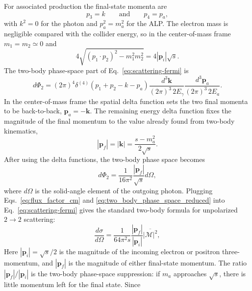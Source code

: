 \documentclass[12pt,a4paper]{article}
\begin{document}
For associated production the final-state momenta are
\begin{equation}
    p_3=k
    \qquad\text{and}\qquad
    p_4=p_a,
\end{equation}
with $k^2=0$ for the photon and $p_a^2=m_{a}^2$ for the ALP. The electron mass
is negligible compared with the collider energy, so in the center-of-mass
frame $m_1=m_2\simeq0$ and
\begin{equation}
    4\sqrt{(p_1\cdot p_2)^2-m_1^2m_2^2}
    =
    4|\mathbf{p}_i|\sqrt{s}.
    \label{eq:flux_factor_cm}
\end{equation}
The two-body phase-space part of Eq.~\eqref{eq:scattering-fermi} is
\begin{equation}
    d\Phi_2
    =
    (2\pi)^4\delta^{(4)}(p_1+p_2-k-p_a)
    \frac{d^3\mathbf{k}}{(2\pi)^3\,2E_\gamma}
    \frac{d^3\mathbf{p}_a}{(2\pi)^3\,2E_a}.
    \label{eq:two_body_phase_space}
\end{equation}
In the center-of-mass frame the spatial delta function sets the two final
momenta to be back-to-back, $\mathbf{p}_a=-\mathbf{k}$. The remaining energy
delta function fixes the magnitude of the final momentum to the value already
found from two-body kinematics,
\begin{equation}
    |\mathbf{p}_f|
    =
    |\mathbf{k}|
    =
    \frac{s-m_{a}^2}{2\sqrt{s}}.
\end{equation}
After using the delta functions, the two-body phase space becomes
\begin{equation}
    d\Phi_2
    =
    \frac{1}{16\pi^2}
    \frac{|\mathbf{p}_f|}{\sqrt{s}}
    d\Omega,
    \label{eq:two_body_phase_space_reduced}
\end{equation}
where $d\Omega$ is the solid-angle element of the outgoing photon. Plugging
Eqs.~\eqref{eq:flux_factor_cm} and
\eqref{eq:two_body_phase_space_reduced} into
Eq.~\eqref{eq:scattering-fermi} gives the standard two-body formula for
unpolarized $2\to2$ scattering:
\begin{equation}
    \frac{d\sigma}{d\Omega}
    =
    \frac{1}{64\pi^2s}
    \frac{|\mathbf{p}_f|}{|\mathbf{p}_i|}
    \overline{|\mathcal{M}|^2},
    \label{eq:two_body_xsec}
\end{equation}
Here $|\mathbf{p}_i|=\sqrt{s}/2$ is the magnitude of the incoming electron or
positron three-momentum, and $|\mathbf{p}_f|$ is the magnitude of either
final-state momentum. The ratio $|\mathbf{p}_f|/|\mathbf{p}_i|$ is the
two-body phase-space suppression: if $m_{a}$ approaches $\sqrt{s}$, there is
little momentum left for the final state. Since
\end{document}
